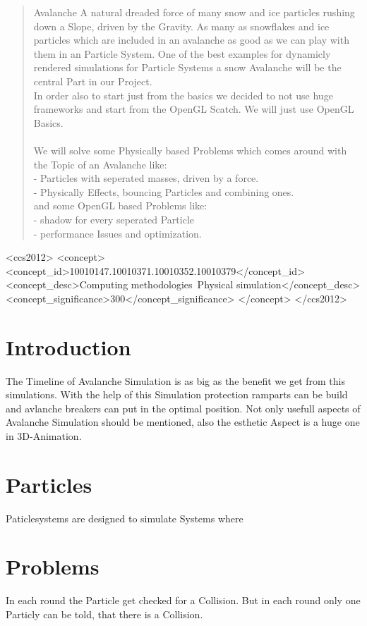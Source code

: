 \documentclass{sig-alternate-05-2015}
\begin{document}
\maketitle
\begin{abstract}
Avalanche
A natural dreaded force of many snow and ice particles rushing down a Slope, driven by the Gravity. As many as snowflakes and ice particles which are included in an avalanche as good as we can play with them in an Particle System. One of the best examples for dynamicly rendered simulations for Particle Systems a snow Avalanche will be the central Part in our Project.\\
In order also to start just from the basics we decided to not use huge frameworks and start from the OpenGL Scatch. We will just use OpenGL Basics.\\ 
\\
We will solve some Physically based Problems which comes around with the Topic of an Avalanche like:\\
- Particles with seperated masses, driven by a force.\\
- Physically Effects, bouncing Particles and combining ones.\\
and some OpenGL based Problems like: \\
- shadow for every seperated Particle \\
- performance Issues and optimization.\\ 
\end{abstract}


\begin{CCSXML}
<ccs2012>
<concept>
<concept_id>10010147.10010371.10010352.10010379</concept_id>
<concept_desc>Computing methodologies~Physical simulation</concept_desc>
<concept_significance>300</concept_significance>
</concept>
</ccs2012>
\end{CCSXML}





\section{Introduction}
The Timeline of Avalanche Simulation is as big as the benefit we get from this simulations. With the help of this Simulation protection ramparts can be build and avlanche breakers can put in the optimal position. Not only usefull aspects of Avalanche Simulation should be mentioned, also the esthetic Aspect is a huge one in 3D-Animation. 

\section{Particles}
Paticlesystems are designed to simulate Systems where

\section{Problems}
In each round the Particle get checked for a Collision. But in each round only one Particly can be told, that there is a Collision.


 
\end{document}
